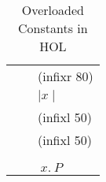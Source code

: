 \begin{isabellebody}
\begin{isamarkuptext}
\begin{table}[htbp]
\begin{center}
\begin{tabular}{lll}
\isa{{\isacharcircum}} & \isa{{\isacharparenleft}{\isacharprime}a{\isacharcolon}{\isacharcolon}power{\isacharparenright}\ {\isasymRightarrow}\ nat\ {\isasymRightarrow}\ {\isacharprime}a} & (infixr 80) \\
\isa{abs} &  \isa{{\isacharparenleft}{\isacharprime}a{\isacharcolon}{\isacharcolon}minus{\isacharparenright}\ {\isasymRightarrow}\ {\isacharprime}a} & ${\mid} x {\mid}$\\
\isa{{\isasymle}} & \isa{{\isacharparenleft}{\isacharprime}a{\isacharcolon}{\isacharcolon}ord{\isacharparenright}\ {\isasymRightarrow}\ {\isacharprime}a\ {\isasymRightarrow}\ bool} & (infixl 50) \\
\isa{{\isacharless}} & \isa{{\isacharparenleft}{\isacharprime}a{\isacharcolon}{\isacharcolon}ord{\isacharparenright}\ {\isasymRightarrow}\ {\isacharprime}a\ {\isasymRightarrow}\ bool} & (infixl 50) \\
\isa{min} &  \isa{{\isacharparenleft}{\isacharprime}a{\isacharcolon}{\isacharcolon}ord{\isacharparenright}\ {\isasymRightarrow}\ {\isacharprime}a\ {\isasymRightarrow}\ {\isacharprime}a} \\
\isa{max} &  \isa{{\isacharparenleft}{\isacharprime}a{\isacharcolon}{\isacharcolon}ord{\isacharparenright}\ {\isasymRightarrow}\ {\isacharprime}a\ {\isasymRightarrow}\ {\isacharprime}a} \\
\isa{Least} & \isa{{\isacharparenleft}{\isacharprime}a{\isacharcolon}{\isacharcolon}ord\ {\isasymRightarrow}\ bool{\isacharparenright}\ {\isasymRightarrow}\ {\isacharprime}a} &
\isa{LEAST}$~x.~P$
\end{tabular}
\caption{Overloaded Constants in HOL}
\label{tab:overloading}
\end{center}
\end{table}%
\end{isamarkuptext}%
\isamarkuptrue%
%
\isadelimtheory
%
\endisadelimtheory
%
\isatagtheory
%
\endisatagtheory
{\isafoldtheory}%
%
\isadelimtheory
%
\endisadelimtheory
\end{isabellebody}%
